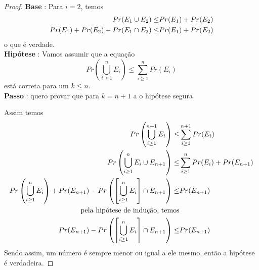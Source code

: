 \documentclass{article}
\begin{document}
\begin{proof}
    \hfill \break
    \hspace*{20pt} \textbf{Base} : Para $i = 2$, temos
    \begin{equation}
    \notag
        \begin{split}
            Pr(E_1 \cup E_2) \leq& Pr(E_1) + Pr(E_2)\\
            Pr(E_1) + Pr(E_2) - Pr(E_1 \cap E_2) \leq& Pr(E_1) + Pr(E_2)
        \end{split}
    \end{equation}
    \hspace*{30pt} o que é verdade.\\

    \textbf{Hipótese} : Vamos assumir que a equação
    \begin{equation}
        Pr\left(\bigcup\limits_{i \geq 1}^{n} E_i\right) \leq \sum\limits_{i \geq 1}^{n}Pr(E_i)
    \end{equation}
    \hspace*{30pt} está correta para um $k \leq n$.\\

    \textbf{Passo} : quero provar que para $k = n + 1$ a o hipótese segura

    Assim temos \newline
    \begin{equation}
    \notag
        \begin{split}
            Pr\left(\bigcup\limits_{i \geq 1}^{n+1} E_i \right) \leq& \sum\limits_{i \geq 1}^{n+1}Pr(E_i)\\
            Pr\left(\bigcup\limits_{i \geq 1}^{n} E_i \cup E_{n+1}\right) \leq & \sum\limits_{i \geq 1}^{n}Pr(E_i) + Pr(E_{n+1})\\
            Pr\left(\bigcup\limits_{i \geq 1}^{n} E_i\right) + Pr(E_{n+1}) - Pr\left(\left[\bigcup\limits_{i \geq 1}^{n} E_i\right]\cap E_{n+1}\right)  \leq &Pr(E_{n+1})\\
            \text{pela hipótese de indução, temos}&\\
            Pr(E_{n+1}) - Pr\left(\left[\bigcup\limits_{i \geq 1}^{n} E_i\right]\cap E_{n+1}\right) \leq & Pr(E_{n+1})
        \end{split}
    \end{equation}
    Sendo assim, um número é sempre menor ou igual a ele mesmo, então a hipótese é verdadeira.
\end{proof}
\end{document}
